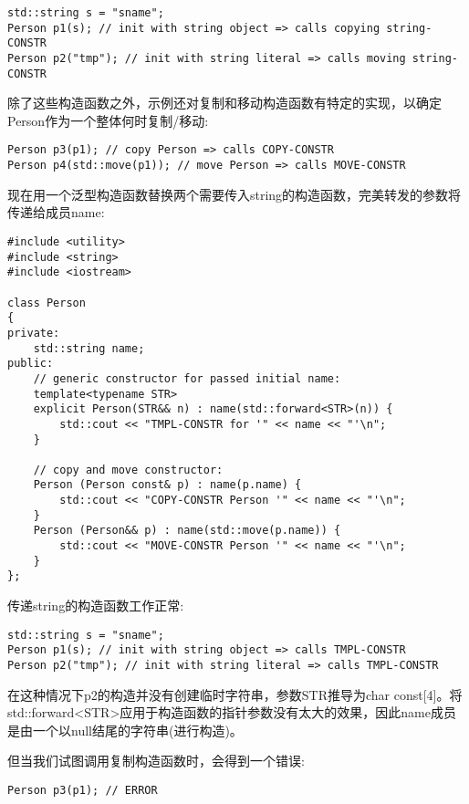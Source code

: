 \begin{lstlisting}[style=styleCXX]
std::string s = "sname";
Person p1(s); // init with string object => calls copying string-CONSTR
Person p2("tmp"); // init with string literal => calls moving string-CONSTR
\end{lstlisting}

除了这些构造函数之外，示例还对复制和移动构造函数有特定的实现，以确定Person作为一个整体何时复制/移动:

\begin{lstlisting}[style=styleCXX]
Person p3(p1); // copy Person => calls COPY-CONSTR
Person p4(std::move(p1)); // move Person => calls MOVE-CONSTR
\end{lstlisting}

现在用一个泛型构造函数替换两个需要传入string的构造函数，完美转发的参数将传递给成员name:

\begin{lstlisting}[style=styleCXX]
#include <utility>
#include <string>
#include <iostream>

class Person
{
private:
	std::string name;
public:
	// generic constructor for passed initial name:
	template<typename STR>
	explicit Person(STR&& n) : name(std::forward<STR>(n)) {
		std::cout << "TMPL-CONSTR for '" << name << "'\n";
	}

	// copy and move constructor:
	Person (Person const& p) : name(p.name) {
		std::cout << "COPY-CONSTR Person '" << name << "'\n";
	}
	Person (Person&& p) : name(std::move(p.name)) {
		std::cout << "MOVE-CONSTR Person '" << name << "'\n";
	}
};
\end{lstlisting}

传递string的构造函数工作正常:

\begin{lstlisting}[style=styleCXX]
std::string s = "sname";
Person p1(s); // init with string object => calls TMPL-CONSTR
Person p2("tmp"); // init with string literal => calls TMPL-CONSTR
\end{lstlisting}

在这种情况下p2的构造并没有创建临时字符串，参数STR推导为char const[4]。将std::forward<STR>应用于构造函数的指针参数没有太大的效果，因此name成员是由一个以null结尾的字符串(进行构造)。

但当我们试图调用复制构造函数时，会得到一个错误:

\begin{lstlisting}[style=styleCXX]
Person p3(p1); // ERROR
\end{lstlisting}

